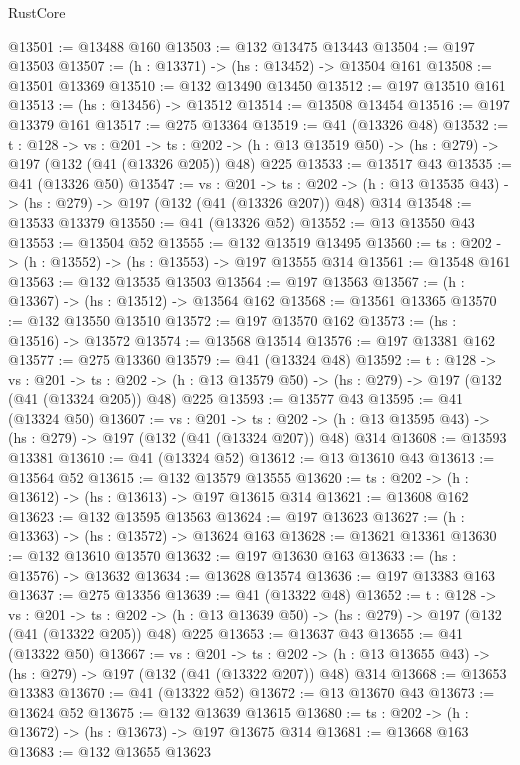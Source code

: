 \begin{lexlean}{RustCore}
\begin{coremodule}
@13501 := @13488 @160
@13503 := @132 @13475 @13443
@13504 := @197 @13503
@13507 := (h : @13371) -> (hs : @13452) -> @13504 @161
@13508 := @13501 @13369
@13510 := @132 @13490 @13450
@13512 := @197 @13510 @161
@13513 := (hs : @13456) -> @13512
@13514 := @13508 @13454
@13516 := @197 @13379 @161
@13517 := @275 @13364
@13519 := @41 (@13326 @48)
@13532 := {t : @128} ->
  {vs : @201} ->
  {ts : @202} -> (h : @13 @13519 @50) -> (hs : @279) -> @197 (@132 (@41 (@13326 @205)) @48) @225
@13533 := @13517 @43
@13535 := @41 (@13326 @50)
@13547 := {vs : @201} ->
  {ts : @202} -> (h : @13 @13535 @43) -> (hs : @279) -> @197 (@132 (@41 (@13326 @207)) @48) @314
@13548 := @13533 @13379
@13550 := @41 (@13326 @52)
@13552 := @13 @13550 @43
@13553 := @13504 @52
@13555 := @132 @13519 @13495
@13560 := {ts : @202} -> (h : @13552) -> (hs : @13553) -> @197 @13555 @314
@13561 := @13548 @161
@13563 := @132 @13535 @13503
@13564 := @197 @13563
@13567 := (h : @13367) -> (hs : @13512) -> @13564 @162
@13568 := @13561 @13365
@13570 := @132 @13550 @13510
@13572 := @197 @13570 @162
@13573 := (hs : @13516) -> @13572
@13574 := @13568 @13514
@13576 := @197 @13381 @162
@13577 := @275 @13360
@13579 := @41 (@13324 @48)
@13592 := {t : @128} ->
  {vs : @201} ->
  {ts : @202} -> (h : @13 @13579 @50) -> (hs : @279) -> @197 (@132 (@41 (@13324 @205)) @48) @225
@13593 := @13577 @43
@13595 := @41 (@13324 @50)
@13607 := {vs : @201} ->
  {ts : @202} -> (h : @13 @13595 @43) -> (hs : @279) -> @197 (@132 (@41 (@13324 @207)) @48) @314
@13608 := @13593 @13381
@13610 := @41 (@13324 @52)
@13612 := @13 @13610 @43
@13613 := @13564 @52
@13615 := @132 @13579 @13555
@13620 := {ts : @202} -> (h : @13612) -> (hs : @13613) -> @197 @13615 @314
@13621 := @13608 @162
@13623 := @132 @13595 @13563
@13624 := @197 @13623
@13627 := (h : @13363) -> (hs : @13572) -> @13624 @163
@13628 := @13621 @13361
@13630 := @132 @13610 @13570
@13632 := @197 @13630 @163
@13633 := (hs : @13576) -> @13632
@13634 := @13628 @13574
@13636 := @197 @13383 @163
@13637 := @275 @13356
@13639 := @41 (@13322 @48)
@13652 := {t : @128} ->
  {vs : @201} ->
  {ts : @202} -> (h : @13 @13639 @50) -> (hs : @279) -> @197 (@132 (@41 (@13322 @205)) @48) @225
@13653 := @13637 @43
@13655 := @41 (@13322 @50)
@13667 := {vs : @201} ->
  {ts : @202} -> (h : @13 @13655 @43) -> (hs : @279) -> @197 (@132 (@41 (@13322 @207)) @48) @314
@13668 := @13653 @13383
@13670 := @41 (@13322 @52)
@13672 := @13 @13670 @43
@13673 := @13624 @52
@13675 := @132 @13639 @13615
@13680 := {ts : @202} -> (h : @13672) -> (hs : @13673) -> @197 @13675 @314
@13681 := @13668 @163
@13683 := @132 @13655 @13623

\end{coremodule}
\end{lexlean}
